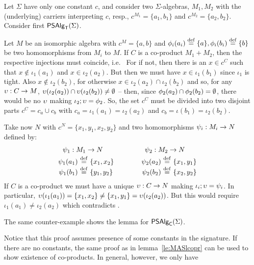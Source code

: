 \documentclass[10pt]{article}
\begin{document}
\begin{Proof}
Let $\Sigma$ have only one constant $c$, and consider two
$\Sigma$-algebras, $M_1,M_2$ with the (underlying) carriers
interpreting $c$, resp., $c^{M_{1}}=\{a_1,b_1\}$ and
$c^{M_{2}}=\{a_2,b_2\}$. Consider first $\mbox{\sf PSAlg}_{\sf T}(\Sigma)$.

Let $M$ be an isomorphic algebra with $c^M=\{a,b\}$ and
$\phi_i(a_i)\stackrel{{\rm \tiny{def}}}=\{a\}, \phi_i(b_i)\stackrel{{\rm \tiny{def}}}=\{b\}$ be two homomorphisms from
$M_i$ to $M$.  If $C$ is a co-product $M_1+M_2$, then the respective
injections must coincide, i.e.\  For if not, then there is an $x\in c^C$
such that $x\not\in\iota_1(a_1)$ and $x\in\iota_2(a_2)$. But then we
must have $x\in\iota_1(b_1)$ since $\iota_1$ is tight. Also
$x\not\in\iota_2(b_2)$, for otherwise
$x\in\iota_2(a_2)\cap\iota_2(b_2)$ and so, for any $\upsilon:C\rightarrow M$,
$\upsilon(\iota_2(a_2))\cap\upsilon(\iota_2(b_2))\not=\emptyset$ -- then, since
$\phi_2(a_2)\cap\phi_2(b_2)=\emptyset$, there would be no $\upsilon$ making
$\iota_2;\upsilon=\phi_2$. So, the set $c^C$ must be divided into
two disjoint parts $c^C= c_a\cup c_b$ with
$c_a=\iota_1(a_1)=\iota_2(a_2)$ and $c_b=\iota(b_1)=\iota_2(b_2)$.

Take now $N$ with $c^N=\{x_1,y_1,x_2,y_2\}$ and two homomorphisms
$\psi_i:M_i\rightarrow N$ defined by:
%
\[
\begin{array}{r@{\ \Def\ }l@{\ \ \ \ \ \ \ \ \ \ \ \ }r@{\ \Def\ }l}
\multicolumn{2}{l}{\ \ \psi_1:M_1\into N} & \multicolumn{2}{l}{\psi_2:M_2\into N} \\[.5ex]
\psi_1(a_1) & \{x_1,x_2\} & \psi_2(a_2) & \{x_1,y_1\} \\
\psi_1(b_1) & \{y_1,y_2\} & \psi_2(b_2) & \{x_2,y_2\}
\end{array}
\]
%
If $C$ is a co-product we must have a unique $\upsilon:C\rightarrow N$ making
$\iota_i;\upsilon=\psi_i$. In particular,
$\upsilon(\iota_1(a_1))=\{x_1,x_2\} \not= \{x_1,y_1\} =
\upsilon(\iota_2(a_2))$. But this would require
$\iota_1(a_1)\not=\iota_2(a_2)$ which contradicts .

The same counter-example shows the lemma for $\mbox{\sf PSAlg}_{\sf C}(\Sigma)$.
\end{Proof}

Notice that this proof assumes presence of some constants in the
signature. If there are no constants, the same proof as in
lemma~\ref{le:MASlcopr} can be used to show existence of
co-products. In general, however, we only have
\end{document}
